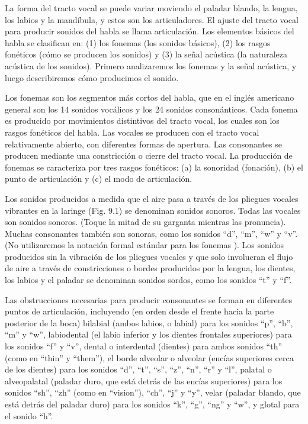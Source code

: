 \documentclass[12pt]{book}
\begin{document}
La forma del tracto vocal se puede variar moviendo el paladar blando, la lengua, los labios y la mandíbula, y estos son los articuladores. El ajuste del tracto vocal para producir sonidos del habla se llama articulación. Los elementos básicos del habla se clasifican en: (1) los fonemas (los sonidos básicos), (2) los rasgos fonéticos (cómo se producen los sonidos) y (3) la señal acústica (la naturaleza acústica de los sonidos). Primero analizaremos los fonemas y la señal acústica, y luego describiremos cómo producimos el sonido.

Los fonemas son los segmentos más cortos del habla, que en el inglés americano general son los 14 sonidos vocálicos y los 24 sonidos consonánticos. Cada fonema es producido por movimientos distintivos del tracto vocal, los cuales son los rasgos fonéticos del habla. Las vocales se producen con el tracto vocal relativamente abierto, con diferentes formas de apertura. Las consonantes se producen mediante una constricción o cierre del tracto vocal. La producción de fonemas se caracteriza por tres rasgos fonéticos: (a) la sonoridad (fonación), (b) el punto de articulación y (c) el modo de articulación.

Los sonidos producidos a medida que el aire pasa a través de los pliegues vocales vibrantes en la laringe (Fig. 9.1) se denominan sonidos sonoros. Todas las vocales son sonidos sonoros. (Toque la mitad de su garganta mientras las pronuncia). Muchas consonantes también son sonoras, como los sonidos ``d'', ``m'', ``w'' y ``v''. (No utilizaremos la notación formal estándar para los fonemas \cite{6, 17, 69}). Los sonidos producidos sin la vibración de los pliegues vocales y que solo involucran el flujo de aire a través de constricciones o bordes producidos por la lengua, los dientes, los labios y el paladar se denominan sonidos sordos, como los sonidos ``t'' y ``f''.

Las obstrucciones necesarias para producir consonantes se forman en diferentes puntos de articulación, incluyendo (en orden desde el frente hacia la parte posterior de la boca) bilabial (ambos labios, o labial) para los sonidos ``p'', ``b'', ``m'' y ``w'', labiodental (el labio inferior y los dientes frontales superiores) para los sonidos ``f'' y ``v'', dental o interdental (dientes) para ambos sonidos ``th'' (como en ``thin'' y ``them''), el borde alveolar o alveolar (encías superiores cerca de los dientes) para los sonidos ``d'', ``t'', ``s'', ``z'', ``n'', ``r'' y ``l'', palatal o alveopalatal (paladar duro, que está detrás de las encías superiores) para los sonidos ``sh'', ``zh'' (como en ``vision''), ``ch'', ``j'' y ``y'', velar (paladar blando, que está detrás del paladar duro) para los sonidos ``k'', ``g'', ``ng'' y ``w'', y glotal para el sonido ``h''.
\end{document}
